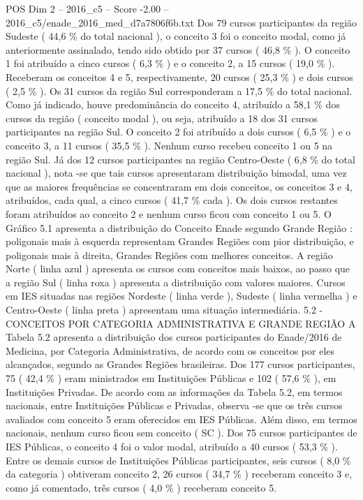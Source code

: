 \begin{textsample}{POS Dim 2 – 2016\_c5 – Score -2.00 – 2016\_c5/enade\_2016\_med\_d7a7806f6b.txt}
Dos 79 cursos participantes da região Sudeste ( 44,6 \% do total nacional ), o conceito 3 foi o conceito modal, como já anteriormente assinalado, tendo sido obtido por 37 cursos ( 46,8 \% ).
O conceito 1 foi atribuído a cinco cursos ( 6,3 \% ) e o conceito 2, a 15 cursos ( 19,0 \% ).
Receberam os conceitos 4 e 5, respectivamente, 20 cursos ( 25,3 \% ) e dois cursos ( 2,5 \% ).
Os 31 cursos da região Sul corresponderam a 17,5 \% do total nacional.
Como já indicado, houve predominância do conceito 4, atribuído a 58,1 \% dos cursos da região ( conceito modal ), ou seja, atribuído a 18 dos 31 cursos participantes na região Sul.
O conceito 2 foi atribuído a dois cursos ( 6,5 \% ) e o conceito 3, a 11 cursos ( 35,5 \% ).
Nenhum curso recebeu conceito 1 ou 5 na região Sul.
Já dos 12 cursos participantes na região Centro-Oeste ( 6,8 \% do total nacional ), nota -se que tais cursos apresentaram distribuição bimodal, uma vez que as maiores frequências se concentraram em dois conceitos, os conceitos 3 e 4, atribuídos, cada qual, a cinco cursos ( 41,7 \% cada ).
Os dois cursos restantes foram atribuídos ao conceito 2 e nenhum curso ficou com conceito 1 ou 5.
O Gráfico 5.1 apresenta a distribuição do Conceito Enade segundo Grande Região : poligonais mais à esquerda representam Grandes Regiões com pior distribuição, e poligonais mais à direita, Grandes Regiões com melhores conceitos.
A região Norte ( linha azul ) apresenta os cursos com conceitos mais baixos, ao passo que a região Sul ( linha roxa ) apresenta a distribuição com valores maiores.
Cursos em IES situadas nas regiões Nordeste ( linha verde ), Sudeste ( linha vermelha ) e Centro-Oeste ( linha preta ) apresentam uma situação intermediária. 5.2 - CONCEITOS POR CATEGORIA ADMINISTRATIVA E GRANDE REGIÃO A Tabela 5.2 apresenta a distribuição dos cursos participantes do Enade/2016 de Medicina, por Categoria Administrativa, de acordo com os conceitos por eles alcançados, segundo as Grandes Regiões brasileiras.
Dos 177 cursos participantes, 75 ( 42,4 \% ) eram ministrados em Instituições Públicas e 102 ( 57,6 \% ), em Instituições Privadas.
De acordo com as informações da Tabela 5.2, em termos nacionais, entre Instituições Públicas e Privadas, observa -se que os três cursos avaliados com conceito 5 eram oferecidos em IES Públicas.
Além disso, em termos nacionais, nenhum curso ficou sem conceito ( SC ).
Dos 75 cursos participantes de IES Públicas, o conceito 4 foi o valor modal, atribuído a 40 cursos ( 53,3 \% ).
Entre os demais cursos de Instituições Públicas participantes, seis cursos ( 8,0 \% da categoria ) obtiveram conceito 2, 26 cursos ( 34,7 \% ) receberam conceito 3 e, como já comentado, três cursos ( 4,0 \% ) receberam conceito 5.

\end{textsample}

